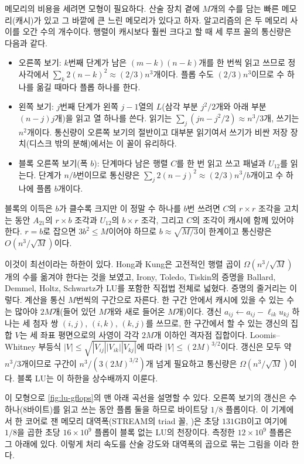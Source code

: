 메모리의 비용을 세려면 모형이 필요하다. 산술 장치 곁에 $M$개의 수를 담는 빠른 메모리(캐시)가 있고 그 바깥에 큰 느린 메모리가 있다고 하자. 알고리즘의 은 두 메모리 사이를 오간 수의 개수이다. 행렬이 캐시보다 훨씬 크다고 할 때 세 루프 꼴의 통신량은 다음과 같다.
\begin{itemize}
\item 오른쪽 보기: $k$번째 단계가 남은 $(m-k)(n-k)$개를 한 번씩 읽고 쓰므로 정사각에서 $\sum_k2(n-k)^2\approx(2/3)n^3$개이다. 플롭 수도 $(2/3)n^3$이므로 수 하나를 옮길 때마다 플롭 하나를 한다.
\item 왼쪽 보기: $j$번째 단계가 왼쪽 $j-1$열의 $L$(삼각 부분 $j^2/2$개와 아래 부분 $(n-j)j$개)을 읽고 열 하나를 쓴다. 읽기는 $\sum_j(jn-j^2/2)\approx n^3/3$개, 쓰기는 $n^2$개이다. 통신량이 오른쪽 보기의 절반이고 대부분 읽기여서 쓰기가 비싼 저장 장치(디스크 밖의 분해)에서는 이 꼴이 유리하다.
\item 블록 오른쪽 보기(폭 $b$): 단계마다 남은 행렬 $C$를 한 번 읽고 쓰고 패널과 $U_{12}$를 읽는다. 단계가 $n/b$번이므로 통신량은 $\sum_j2(n-j)^2\approx(2/3)n^3/b$개이고 수 하나에 플롭 $b$개이다.
\end{itemize}
블록의 이득은 $b$가 클수록 크지만 이 정말 수 하나를 $b$번 쓰려면 $C$의 $r\times r$ 조각을 고치는 동안 $A_{21}$의 $r\times b$ 조각과 $U_{12}$의 $b\times r$ 조각, 그리고 $C$의 조각이 캐시에 함께 있어야 한다. $r=b$로 잡으면 $3b^2\le M$이어야 하므로 $b\approx\sqrt{M/3}$이 한계이고 통신량은 $O(n^3/\sqrt M)$이다.

이것이 최선이라는 하한이 있다. Hong과 Kung은 고전적인 행렬 곱이 $\Omega(n^3/\sqrt M)$개의 수를 옮겨야 한다는 것을 보였고\cite{hong1981io}, Irony, Toledo, Tiskin의 증명\cite{irony2004communication}을 Ballard, Demmel, Holtz, Schwartz가 LU를 포함한 직접법 전체로 넓혔다\cite{ballard2011minimizing}. 증명의 줄거리는 이렇다. 계산을 통신 $M$번씩의 구간으로 자른다. 한 구간 안에서 캐시에 있을 수 있는 수는 많아야 $2M$개(들어 있던 $M$개와 새로 들어온 $M$개)이다. 갱신 $a_{ij}\gets a_{ij}-\ell_{ik}u_{kj}$ 하나는 세 첨자 쌍 $(i,j)$, $(i,k)$, $(k,j)$를 쓰므로, 한 구간에서 할 수 있는 갱신의 집합 $V$는 세 좌표 평면으로의 사영이 각각 $2M$개 이하인 격자점 집합이다. Loomis--Whitney 부등식 $|V|\le\sqrt{|V_{ij}||V_{ik}||V_{kj}|}$에 따라 $|V|\le(2M)^{3/2}$이다. 갱신은 모두 약 $n^3/3$개이므로 구간이 $n^3/(3(2M)^{3/2})$개 넘게 필요하고 통신량은 $\Omega(n^3/\sqrt M)$이다. 블록 LU는 이 하한을 상수배까지 이룬다.

이 모형으로 \cref{fig:lu-gflops}의 맨 아래 곡선을 설명할 수 있다. 오른쪽 보기의 갱신은 수 하나(8바이트)를 읽고 쓰는 동안 플롭 둘을 하므로 바이트당 $1/8$ 플롭이다. 이 기계에서 한 코어로 잰 메모리 대역폭(STREAM의 triad 꼴, )은 초당 $131$GB이고 여기에 $1/8$을 곱한 초당 $16\times10^9$ 플롭이 블록 없는 LU의 천장이다. 측정한 $12\times10^9$ 플롭은 그 아래에 있다. 이렇게 처리 속도를 산술 강도와 대역폭의 곱으로 묶는 그림을 이라 한다.

